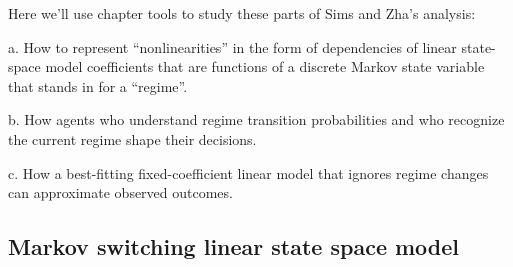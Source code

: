 \noindent Here we'll use chapter  tools to  study these parts of Sims and Zha's analysis:

\medskip
\item{a.} How to represent ``nonlinearities'' in the form of dependencies of linear state-space model 
coefficients that are functions of  a discrete  Markov state variable that
stands in for a ``regime''.

\medskip
\item{b.} How agents who understand regime transition probabilities and who recognize the current regime shape their decisions.

\medskip
\item{c.} How a best-fitting fixed-coefficient linear model that ignores regime changes can approximate observed 
outcomes.


\medskip

\subsection{Markov switching linear state space model}

